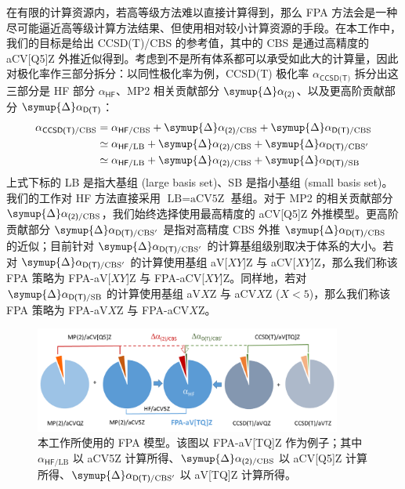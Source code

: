 在有限的计算资源内，若高等级方法难以直接计算得到，那么 FPA 方法会是一种尽可能逼近高等级计算方法结果、但使用相对较小计算资源的手段。在本工作中，我们的目标是给出 CCSD(T)/CBS 的参考值，其中的 CBS 是通过高精度的 aCV[Q5]Z 外推近似得到。考虑到不是所有体系都可以承受如此大的计算量，因此对极化率作三部分拆分：以同性极化率为例，CCSD(T) 极化率 $\alpha_\textsf{CCSD(T)}$ 拆分出这三部分是 HF 部分 $\alpha_\textsf{HF}$、MP2 相关贡献部分 $\symup{\Delta} \alpha_\textsf{(2)}$、以及更高阶贡献部分 $\symup{\Delta} \alpha_\textsf{D(T)}$：
\begin{align}
    \alpha_{\textsf{CCSD(T)}/\text{CBS}} &= \alpha_{\textsf{HF}/\text{CBS}} + \symup{\Delta} \alpha_{\textsf{(2)}/\text{CBS}} + \symup{\Delta} \alpha_{\textsf{D(T)}/\text{CBS}} \notag\\
    &\simeq \alpha_{\textsf{HF}/\text{LB}} + \symup{\Delta} \alpha_{\textsf{(2)}/\text{CBS}} + \symup{\Delta} \alpha_{\textsf{D(T)}/\text{CBS}'} \notag\\
    &\simeq \alpha_{\textsf{HF}/\text{LB}} + \symup{\Delta} \alpha_{\textsf{(2)}/\text{CBS}} + \symup{\Delta} \alpha_{\textsf{D(T)}/\text{SB}}
\end{align}
上式下标的 LB 是指大基组 (large basis set)、SB 是指小基组 (small basis set)。我们的工作对 HF 方法直接采用 $\text{LB} = \text{aCV5Z}$ 基组。对于 MP2 的相关贡献部分 $\symup{\Delta} \alpha_{\textsf{(2)}/\text{CBS}}$，我们始终选择使用最高精度的 aCV[Q5]Z 外推模型。更高阶贡献部分 $\symup{\Delta} \alpha_{\textsf{D(T)}/\text{CBS}'}$ 是指对高精度 CBS 外推 $\symup{\Delta} \alpha_{\textsf{D(T)}/\text{CBS}}$ 的近似；目前针对 $\symup{\Delta} \alpha_{\textsf{D(T)}/\text{CBS}'}$ 的计算基组级别取决于体系的大小。若对 $\symup{\Delta} \alpha_{\textsf{D(T)}/\text{CBS}'}$ 的计算使用基组 aV[$XY$]Z 与 aCV[$XY$]Z，那么我们称该 FPA 策略为 FPA-aV[$XY$]Z 与 FPA-aCV[$XY$]Z。同样地，若对 $\symup{\Delta} \alpha_{\textsf{D(T)}/\text{SB}}$ 的计算使用基组 aV$X$Z 与 aCV$X$Z ($X < 5$)，那么我们称该 FPA 策略为 FPA-aV$X$Z 与 FPA-aCV$X$Z。

\begin{figure}[ht]
    \centering
    \caption[静态极化率计算的 FPA 模型]{本工作所使用的 FPA 模型。该图以 FPA-aV[TQ]Z 作为例子；其中 $\alpha_{\textsf{HF}/\text{LB}}$ 以 aCV5Z 计算所得、$\symup{\Delta} \alpha_{\textsf{(2)}/\text{CBS}}$ 以 aCV[Q5]Z 计算所得、$\symup{\Delta} \alpha_{\textsf{D(T)}/\text{CBS}'}$ 以 aV[TQ]Z 计算所得。}
    \label{fig.fig-1}
    \includegraphics[width=0.9\textwidth]{assets/fig-1.png}
\end{figure}

